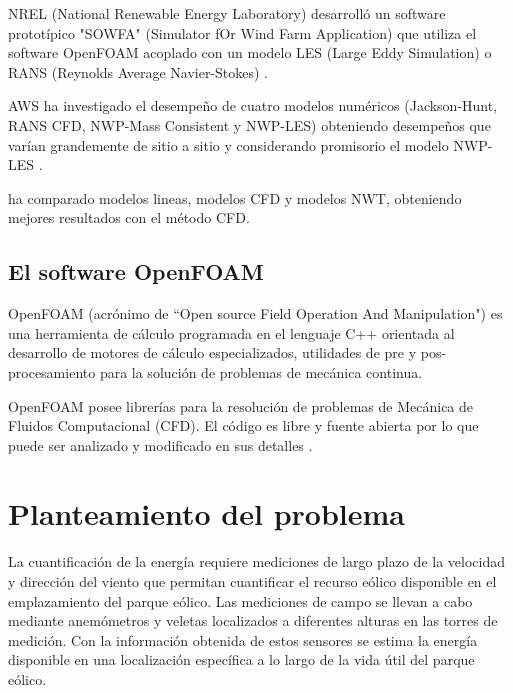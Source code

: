 NREL (National Renewable Energy Laboratory) desarrolló un software prototípico "SOWFA" (Simulator fOr Wind Farm Application) que utiliza el software OpenFOAM acoplado con un modelo LES (Large Eddy Simulation) o RANS (Reynolds Average Navier-Stokes) \citep{stull_introduction_2012}. 

AWS ha investigado el desempeño de cuatro modelos numéricos (Jackson-Hunt, RANS CFD, NWP-Mass Consistent y NWP-LES) obteniendo desempeños que varían grandemente de sitio a sitio y considerando promisorio el modelo NWP-LES \cite{brower_evaluation_2013}.

\cite{bengtsson_turbulence_????} ha comparado modelos lineas, modelos CFD y modelos NWT, obteniendo mejores resultados con el método CFD.

\subsection{El software OpenFOAM}

OpenFOAM (acrónimo de ``Open source Field Operation And Manipulation") es una herramienta de cálculo programada en el lenguaje C++ orientada al desarrollo de motores de cálculo especializados, utilidades de pre y pos-procesamiento para la solución de problemas de mecánica continua.

OpenFOAM posee librerías  para la resolución de problemas de Mecánica de Fluidos Computacional (CFD). El código es libre y fuente abierta por lo que puede ser analizado y modificado en sus detalles \citep*{wikipedia_openfoam_2016}.





\section{Planteamiento del problema}


La cuantificación de la energía requiere mediciones de largo plazo de la velocidad y dirección del viento que permitan cuantificar el recurso eólico disponible en el emplazamiento del parque eólico. Las mediciones de campo se llevan a cabo mediante anemómetros y veletas localizados a diferentes alturas en las torres de medición. Con la información obtenida de estos sensores se estima la energía disponible en una localización específica a lo largo de la vida útil del parque eólico. 

